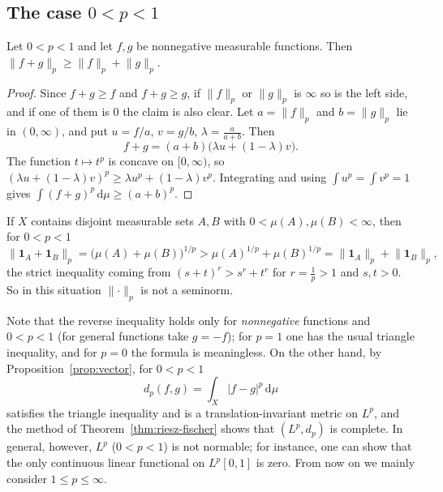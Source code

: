 \documentclass[11pt]{article}
\newcommand{\norm}[1]{\lVert #1\rVert}
\newcommand{\dmu}{\,\mathrm{d}\mu}
\newcommand{\ind}{\mathbf{1}}
\begin{document}
\subsection{The case $0<p<1$}

\begin{proposition}\label{prop:reverse}
Let $0<p<1$ and let $f,g$ be nonnegative measurable functions. Then $\norm{f+g}_{p}\ge\norm{f}_{p}+\norm{g}_{p}$.
\end{proposition}

\begin{proof}
Since $f+g\ge f$ and $f+g\ge g$, if $\norm{f}_{p}$ or $\norm{g}_{p}$ is $\infty$ so is the left side, and if one of them is $0$ the claim is also clear. Let $a=\norm{f}_{p}$ and $b=\norm{g}_{p}$ lie in $(0,\infty)$, and put $u=f/a$, $v=g/b$, $\lambda=\frac{a}{a+b}$. Then
\[
f+g=(a+b)\bigl(\lambda u+(1-\lambda)v\bigr).
\]
The function $t\mapsto t^{p}$ is concave on $[0,\infty)$, so $(\lambda u+(1-\lambda)v)^{p}\ge\lambda u^{p}+(1-\lambda)v^{p}$. Integrating and using $\int u^{p}=\int v^{p}=1$ gives $\int(f+g)^{p}\dmu\ge(a+b)^{p}$.
\end{proof}

\begin{example}\label{ex:p-less-1-L}
If $X$ contains disjoint measurable sets $A,B$ with $0<\mu(A),\mu(B)<\infty$, then for $0<p<1$
\[
\norm{\ind_{A}+\ind_{B}}_{p}=\bigl(\mu(A)+\mu(B)\bigr)^{1/p}>\mu(A)^{1/p}+\mu(B)^{1/p}=\norm{\ind_{A}}_{p}+\norm{\ind_{B}}_{p},
\]
the strict inequality coming from $(s+t)^{r}>s^{r}+t^{r}$ for $r=\frac1p>1$ and $s,t>0$. So in this situation $\norm{\cdot}_{p}$ is not a seminorm.
\end{example}

\begin{remark}
Note that the reverse inequality holds only for \emph{nonnegative} functions and $0<p<1$ (for general functions take $g=-f$); for $p=1$ one has the usual triangle inequality, and for $p=0$ the formula is meaningless. On the other hand, by Proposition~\ref{prop:vector}, for $0<p<1$
\[
d_{p}(f,g)=\int_{X}|f-g|^{p}\dmu
\]
satisfies the triangle inequality and is a translation-invariant metric on $L^{p}$, and the method of Theorem~\ref{thm:riesz-fischer} shows that $(L^{p},d_{p})$ is complete. In general, however, $L^{p}$ ($0<p<1$) is not normable; for instance, one can show that the only continuous linear functional on $L^{p}[0,1]$ is zero. From now on we mainly consider $1\le p\le\infty$.
\end{remark}
\end{document}
